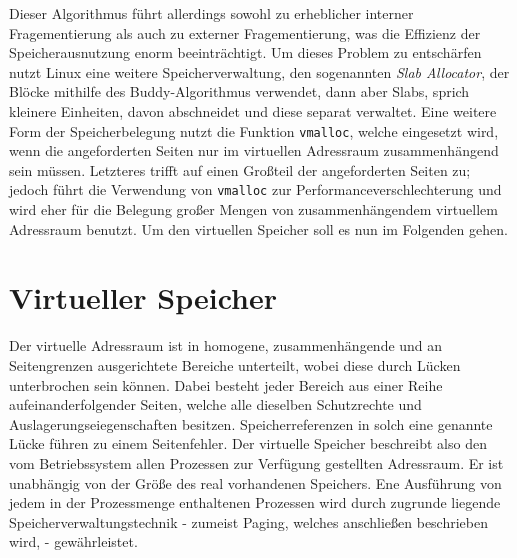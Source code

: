 \documentclass[11pt,a4paper]{article}
\begin{document}
\newline
Dieser Algorithmus führt allerdings sowohl zu erheblicher interner Fragementierung als auch zu externer Fragementierung, was die Effizienz der Speicherausnutzung enorm beeinträchtigt.
\newline
Um dieses Problem zu entschärfen nutzt Linux eine weitere Speicherverwaltung, den sogenannten \textit{Slab Allocator}, der Blöcke mithilfe des Buddy-Algorithmus verwendet, dann aber Slabs, sprich kleinere Einheiten, davon abschneidet und diese separat verwaltet. 
\newline
Eine weitere Form der Speicherbelegung nutzt die Funktion \texttt{vmalloc}, welche eingesetzt wird, wenn die angeforderten Seiten nur im virtuellen Adressraum zusammenhängend sein müssen. Letzteres trifft auf einen Großteil der 
angeforderten Seiten zu; jedoch führt die Verwendung von \texttt{vmalloc} zur Performanceverschlechterung und wird eher für die Belegung großer Mengen von zusammenhängendem virtuellem Adressraum benutzt. Um den virtuellen Speicher soll es nun im Folgenden gehen.

\newpage 
\section*{Virtueller Speicher}
Der virtuelle Adressraum ist in homogene, zusammenhängende und an Seitengrenzen ausgerichtete Bereiche unterteilt, wobei diese durch Lücken unterbrochen sein können. Dabei besteht jeder Bereich aus einer Reihe aufeinanderfolgender Seiten, welche alle dieselben Schutzrechte und Auslagerungseiegenschaften besitzen. Speicherreferenzen in solch eine genannte Lücke führen zu einem Seitenfehler. Der virtuelle Speicher beschreibt also den vom Betriebssystem allen Prozessen zur Verfügung gestellten Adressraum. Er ist unabhängig von der Größe des real vorhandenen Speichers. Ene Ausführung von jedem in der Prozessmenge enthaltenen Prozessen wird durch zugrunde liegende Speicherverwaltungstechnik - zumeist Paging, welches anschließen beschrieben wird, - gewährleistet. 
\end{document}
